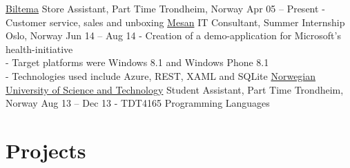 \documentclass[print]{friggeri-cv}
\begin{document}
\begin{entrylist}
    \entryx
        {\href{http://biltema.no/}{Biltema}}
        {Store Assistant, Part Time}
        {Trondheim, Norway}
        {Apr 05 – Present}
        {- Customer service, sales and unboxing}
    \entryspace
    \entryx
        {\href{http://mesan.no/}{Mesan}}
        {IT Consultant, Summer Internship}
        {Oslo, Norway}
        {Jun 14 – Aug 14}
        {- Creation of a demo-application for Microsoft's health-initiative\\
         - Target platforms were Windows 8.1 and Windows Phone 8.1\\
         - Technologies used include Azure, REST, XAML and SQLite}
    \entryspace
    \entryx
        {\href{http://ntnu.no/}{Norwegian University of Science and Technology}}
        {Student Assistant, Part Time}
        {Trondheim, Norway}
        {Aug 13 – Dec 13}
        {- TDT4165 Programming Languages}
\end{entrylist}

\section{Projects}
\end{document}
